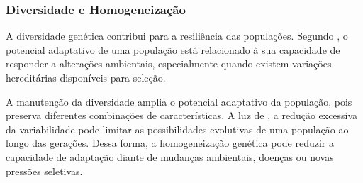 \subsubsection{Diversidade e Homogeneização}
\label{subsubsec:diversidade-homogeneizacao}

A diversidade genética contribui para a resiliência das populações. Segundo , o potencial adaptativo de uma população está relacionado à sua capacidade de responder a alterações ambientais, especialmente quando existem variações hereditárias disponíveis para seleção.

A manutenção da diversidade amplia o potencial adaptativo da população, pois preserva diferentes combinações de características. A luz de  , a redução excessiva da variabilidade pode limitar as possibilidades evolutivas de uma população ao longo das gerações. Dessa forma, a homogeneização genética pode reduzir a capacidade de adaptação diante de mudanças ambientais, doenças ou novas pressões seletivas.
